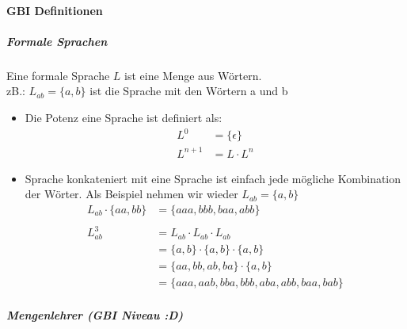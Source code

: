\documentclass[12pt]{article}
\begin{document}
\paragraph{\Large GBI Definitionen}
\subparagraph{\large Formale Sprachen}
\normalsize
\begin{flushleft}
    Eine formale Sprache $L$ ist eine Menge aus Wörtern. \\
    zB.: $L_{ab} = \{a,b\}$ ist die Sprache mit den Wörtern a und b
    \begin{itemize}
        \item Die Potenz eine Sprache ist definiert als: \\
        \begin{align*}
            L^0 &= \{\epsilon\} \\
            L^{n + 1} &= L \cdot L^n
        \end{align*}
        \item Sprache konkateniert mit eine Sprache ist einfach jede mögliche Kombination der Wörter. Als Beispiel nehmen wir wieder $L_{ab} = \{a,b\}$
        \begin{align*}
            L_{ab} \cdot \{aa,bb\} &= \{aaa,bbb,baa,abb\} \\ \\
            L_{ab}^3 &= L_{ab} \cdot L_{ab} \cdot L_{ab} \\
            &= \{a,b\} \cdot \{a,b\} \cdot \{a,b\} \\
            &= \{aa,bb,ab,ba\} \cdot \{a,b\} \\
            &= \{aaa,aab,bba,bbb,aba,abb,baa,bab\}
        \end{align*}
    \end{itemize}
\end{flushleft}
\subparagraph{\large Mengenlehrer (GBI Niveau :D)}
\normalsize
\end{document}
